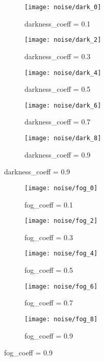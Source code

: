 \begin{figure}[H]
	\centering
	\begin{subfigure}[b]{0.18\textwidth}
		\centering
		\texttt{[image: noise/dark\_0]}
		\caption{darkness\_coeff = 0.1}
		\label{mcdo_fn2}
	\end{subfigure}
	\hfill
	\begin{subfigure}[b]{0.18\textwidth}
		\centering
		\texttt{[image: noise/dark\_2]}
		\caption{darkness\_coeff = 0.3}
		\label{der_fn2}
	\end{subfigure}
	\hfill
	\begin{subfigure}[b]{0.18\textwidth}
		\centering
		\texttt{[image: noise/dark\_4]}
		\caption{darkness\_coeff = 0.5}
		\label{homo_fn3}
	\end{subfigure}
	\hfill
	\begin{subfigure}[b]{0.18\textwidth}
		\centering
		\texttt{[image: noise/dark\_6]}
		\caption{darkness\_coeff = 0.7}
		\label{hetero_fn3}
	\end{subfigure}
	\hfill
	\begin{subfigure}[b]{0.18\textwidth}
		\centering
		\texttt{[image: noise/dark\_8]}
		\caption{darkness\_coeff = 0.9}
		\label{mcdo_fn3}
	\end{subfigure}
	\hfill
	\label{fig_noise_dark}
\end{figure}
\begin{figure}[H]\ContinuedFloat
	\centering
	\begin{subfigure}[b]{0.18\textwidth}
		\centering
		\texttt{[image: noise/fog\_0]}
		\caption{fog\_coeff = 0.1}
		\label{mcdo_fn2}
	\end{subfigure}
	\hfill
	\begin{subfigure}[b]{0.18\textwidth}
		\centering
		\texttt{[image: noise/fog\_2]}
		\caption{fog\_coeff = 0.3}
		\label{der_fn2}
	\end{subfigure}
	\hfill
	\begin{subfigure}[b]{0.18\textwidth}
		\centering
		\texttt{[image: noise/fog\_4]}
		\caption{fog\_coeff = 0.5}
		\label{homo_fn3}
	\end{subfigure}
	\hfill
	\begin{subfigure}[b]{0.18\textwidth}
		\centering
		\texttt{[image: noise/fog\_6]}
		\caption{fog\_coeff = 0.7}
		\label{hetero_fn3}
	\end{subfigure}
	\hfill
	\begin{subfigure}[b]{0.18\textwidth}
		\centering
		\texttt{[image: noise/fog\_8]}
		\caption{fog\_coeff = 0.9}
		\label{mcdo_fn3}
	\end{subfigure}
	\hfill
	\label{fig_noise_fog}
\end{figure}
